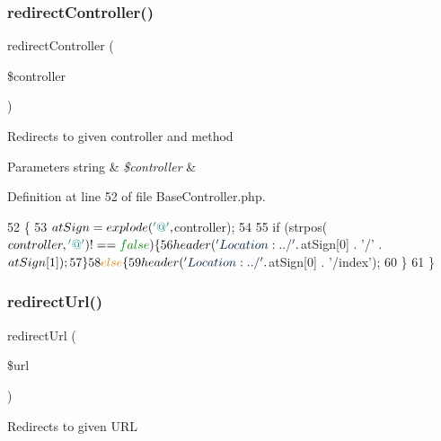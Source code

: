 \subsubsection{\texorpdfstring{redirect\+Controller()}{redirectController()}}
{\footnotesize\ttfamily redirect\+Controller (\begin{DoxyParamCaption}\item[{}]{\$controller }\end{DoxyParamCaption})\hspace{0.3cm}{\ttfamily [protected]}}

Redirects to given controller and method


\begin{DoxyParams}[1]{Parameters}
string & {\em \$controller} & \\
\hline
\end{DoxyParams}


Definition at line 52 of file Base\+Controller.\+php.


\begin{DoxyCode}
52                                                        \{
53         $atSign = explode(\textcolor{charliteral}{'@'}, $controller);
54 
55         \textcolor{keywordflow}{if} (strpos($controller, \textcolor{charliteral}{'@'}) !== \textcolor{keyword}{false}) \{
56             header(\textcolor{stringliteral}{'Location:../'} . $atSign[0] . \textcolor{charliteral}{'/'} . $atSign[1]);
57         \}
58         \textcolor{keywordflow}{else} \{
59             header(\textcolor{stringliteral}{'Location:../'} . $atSign[0] . \textcolor{stringliteral}{'/index'});
60         \}
61     \}
\end{DoxyCode}
\hypertarget{class_base_controller_a9f95c7503770ed9c974005b363ec3d00}{}\label{class_base_controller_a9f95c7503770ed9c974005b363ec3d00} 
\subsubsection{\texorpdfstring{redirect\+Url()}{redirectUrl()}}
{\footnotesize\ttfamily redirect\+Url (\begin{DoxyParamCaption}\item[{}]{\$url }\end{DoxyParamCaption})\hspace{0.3cm}{\ttfamily [protected]}}

Redirects to given U\+RL


